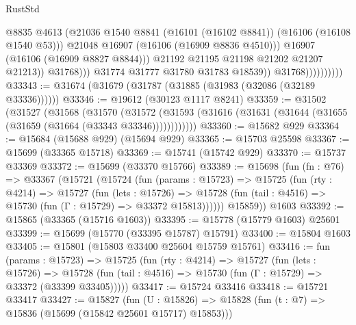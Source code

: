 \begin{lexlean}{RustStd}
\begin{coremodule}
                                          @8835
                                          @4613
                                          (@21036
                                            @1540
                                            @8841
                                            (@16101 (@16102 @8841))
                                            (@16106 (@16108 @1540 @53)))
                                          @21048
                                          @16907
                                          (@16106 (@16909 @8836 @4510)))
                                        @16907
                                        (@16106 (@16909 @8827 @8844)))
                                      @21192
                                      @21195
                                      @21198
                                      @21202
                                      @21207
                                      @21213))
                                  @31768)))
                            @31774
                            @31777
                            @31780
                            @31783
                            @18539))
                        @31768))))))))))
@33343 := @31674 (@31679 (@31787 (@31885 (@31983 (@32086 (@32189 @33336))))))
@33346 := @19612 (@30123 @1117 @8241)
@33359 := @31502
    (@31527
      (@31568
        (@31570
          (@31572 (@31593 (@31616 (@31631 (@31644 (@31655 (@31659 (@31664 (@33343 @33346))))))))))))
@33360 := @15682 @929
@33364 := @15684 (@15688 @929) (@15694 @929)
@33365 := @15703 @25598
@33367 := @15699 (@33365 @15718)
@33369 := @15741 (@15742 @929)
@33370 := @15737 @33369
@33372 := @15699 (@33370 @15766)
@33389 := @15698
    (fun (fn : @76) =>
    @33367
      (@15721
        (@15724
          (fun (params : @15723) =>
          @15725
            (fun (rty : @4214) =>
            @15727
              (fun (lets : @15726) =>
              @15728 (fun (tail : @4516) => @15730 (fun (Γ : @15729) => @33372 @15813))))))
        @15859))
    @1603
@33392 := @15865 (@33365 (@15716 @1603))
@33395 := @15778 (@15779 @1603) @25601
@33399 := @15699 (@15770 (@33395 @15787) @15791)
@33400 := @15804 @1603
@33405 := @15801 (@15803 @33400 @25604 @15759 @15761)
@33416 := fun (params : @15723) =>
  @15725
    (fun (rty : @4214) =>
    @15727
      (fun (lets : @15726) =>
      @15728 (fun (tail : @4516) => @15730 (fun (Γ : @15729) => @33372 (@33399 @33405)))))
@33417 := @15724 @33416
@33418 := @15721 @33417
@33427 := @15827
    (fun (U : @15826) => @15828 (fun (t : @7) => @15836 (@15699 (@15842 @25601 @15717) @15853)))

\end{coremodule}
\end{lexlean}
